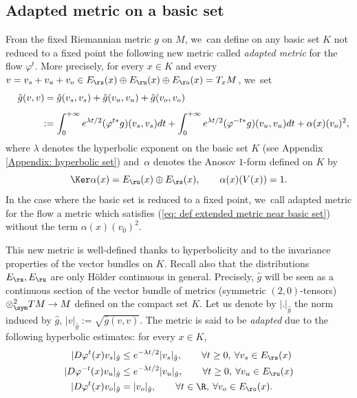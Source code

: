 \subsection{Adapted metric on a basic set}\label{subsubsection adapted metric}

From the fixed Riemannian metric $g$ on $M$, we~can define on any basic set $K$ not reduced to a fixed point the following new metric called \emph{adapted metric} for the flow $\varphi^t$. More precisely, for every $x \in K$ and every $v = v_s + v_u + v_o \in E_\rs (x) \oplus E_\ru (x) \oplus E_\ro (x) = T_x M$, we~set
\begin{align}\label{eq: def extended metric near basic set}
\quad\hat{g} (v,v) \!\!&\hphantom{:}= \hat{g}(v_s, v_s) + \hat{g}(v_u, v_u) + \hat{g}(v_o, v_o) \notag\\[-1pt]\\[-10pt]\notag
&:= \int_0^{+\infty} e^{\lambda t /2} (\varphi^{t*} g) (v_s,v_s) dt + \int_0^{+\infty} e^{\lambda t /2} (\varphi^{-t*} g) (v_u,v_u) dt + \alpha(x) (v_o)^2,
\end{align}
where $\lambda$ denotes the hyperbolic exponent on the basic set $K$ (see Appendix \ref{Appendix: hyperbolic set}) and~$\alpha$ denotes the Anosov $1$-form defined on $K$ by
\[
\Ker \alpha (x) = E_\ru (x) \oplus E_\rs (x), \qquad \alpha (x) (V(x)) = 1.
\]
In the case where the basic set is reduced to a fixed point, we~call adapted metric for the flow a metric which satisfies (\ref{eq: def extended metric near basic set}) without the term $\alpha (x) (v_0)^2$.

This new metric is well-defined thanks to hyperbolicity and to the invariance properties of the vector bundles on $K$. Recall also that the distributions $E_\rs, E_\ru$ are only Hölder continuous in general. Precisely, $\hat{g}$ will be seen as a continuous section of the vector bundle of metrics (\ie symmetric $(2,0)$-tensors) $\otimes_{\sym}^2 T M \to M$ defined on the compact set $K$. Let us denote by $|.|_{\hat{g}}$ the norm induced by $\hat{g}$, \ie $|v|_{\hat{g}}:= \sqrt{\hat{g}(v,v)}$. The metric is said to be \textit{adapted} due to the following hyperbolic estimates: for every $x \in K$,
\begin{equation}\label{hyperbolic estimates for the adapted metric}
\begin{split}
|D\varphi^t (x) v_s |_{\hat{g}} &\leq e^{-\lambda t /2} |v_s |_{\hat{g}}, \qquad \forall t \geq 0, \: \forall v_s \in E_\rs (x) \\
|D\varphi^{-t} (x) v_u |_{\hat{g}} &\leq e^{-\lambda t /2} |v_u |_{\hat{g}}, \qquad \forall t \geq 0, \: \forall v_u \in E_\ru (x) \\
|D\varphi^t (x) v_o |_{\hat{g}} &= |v_o |_{\hat{g}}, \qquad \forall t \in \R, \:\forall v_o \in E_\ro (x).
\end{split}
\end{equation}


